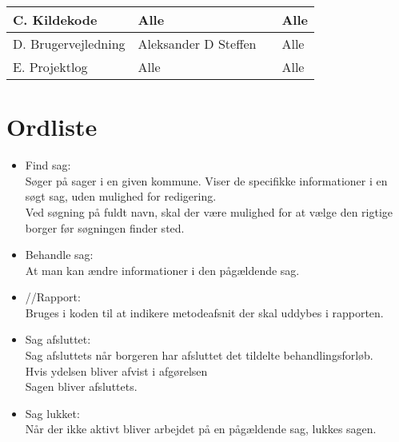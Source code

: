 \begin{center}
\begin{longtable}{|m{5.8cm}|m{3.5cm}|m{3.5cm}|m{3.2cm}|}
C. Kildekode & Alle & & Alle\\ \hline

D. Brugervejledning & Aleksander D \newline Steffen & & Alle\\ \hline

E. Projektlog & Alle & & Alle\\ \hline


\end{longtable}
\end{center}

\section{Ordliste}

\begin{itemize}
\renewcommand\labelitemi{--}
\item Find sag: \\
Søger på sager i en given kommune. Viser de specifikke informationer i en søgt sag, uden mulighed for redigering. \\
Ved søgning på fuldt navn, skal der være mulighed for at vælge den rigtige borger før søgningen finder sted.
\item Behandle sag: \\
At man kan ændre informationer i den pågældende sag.
\item //Rapport: \\
Bruges i koden til at indikere metodeafsnit der skal uddybes i rapporten.
\item Sag afsluttet: \\
Sag afsluttets når borgeren har afsluttet det tildelte behandlingsforløb. \\
Hvis ydelsen bliver afvist i afgørelsen \\
Sagen bliver afsluttets.
\item Sag lukket: \\
Når der ikke aktivt bliver arbejdet på en pågældende sag, lukkes sagen.
\end{itemize}

